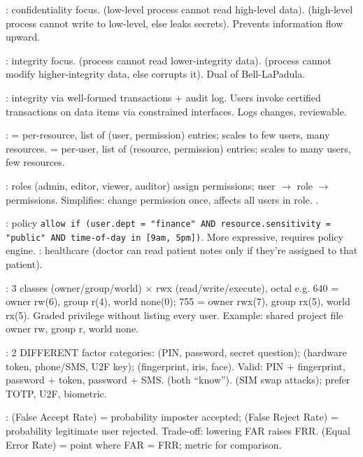 : confidentiality focus.  (low-level process cannot read high-level data).  (high-level process cannot write to low-level, else leaks secrets). Prevents information flow upward. 

: integrity focus.  (process cannot read lower-integrity data).  (process cannot modify higher-integrity data, else corrupts it). Dual of Bell-LaPadula.

: integrity via well-formed transactions + audit log. Users invoke certified transactions on data items via constrained interfaces. Logs changes, reviewable.

:  = per-resource, list of (user, permission) entries; scales to few users, many resources.  = per-user, list of (resource, permission) entries; scales to many users, few resources.

: roles (admin, editor, viewer, auditor) assign permissions; user $\to$ role $\to$ permissions. Simplifies: change permission once, affects all users in role. .

: policy \texttt{allow if (user.dept = "finance" AND resource.sensitivity = "public" AND time-of-day in [9am, 5pm])}. More expressive, requires policy engine. : healthcare (doctor can read patient notes only if they're assigned to that patient).

: 3 classes (owner/group/world) $\times$ rwx (read/write/execute), octal e.g. 640 = owner rw(6), group r(4), world none(0); 755 = owner rwx(7), group rx(5), world rx(5). Graded privilege without listing every user. Example: shared project file \to owner rw, group r, world none.

: 2 DIFFERENT factor categories:  (PIN, password, secret question);  (hardware token, phone/SMS, U2F key);  (fingerprint, iris, face). Valid: PIN + fingerprint, password + token, password + SMS.  (both ``know'').  (SIM swap attacks); prefer TOTP, U2F, biometric.

:  (False Accept Rate) = probability imposter accepted;  (False Reject Rate) = probability legitimate user rejected. Trade-off: lowering FAR raises FRR.  (Equal Error Rate) = point where FAR = FRR; metric for comparison.


